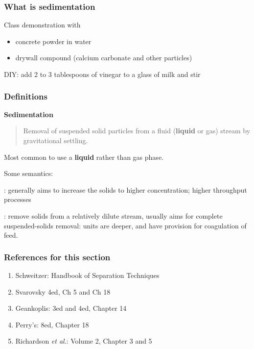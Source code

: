 \begin{comment}

	/Users/kevindunn/Sync/Figures/examples/waste-water-treatment/flickr-4578619015_895f8dabbb_o-CC-BY-NC-SA-2.jpg
	See: http://www.flickr.com/photos/sawater/6434889743/  
	Watch video: http://www.youtube.com/watch?v=gVeW1rr8GEI&feature=related
	Irregular sedmination: http://www.youtube.com/watch?v=u6Y6d7oH6Vs&feature=relmfu

\end{comment}

	
	
\begin{frame}\frametitle{What is sedimentation}
	Class demonstration with
	\begin{itemize}
		\item	concrete powder in water
		\item	drywall compound (calcium carbonate and other particles)
	\end{itemize}

	\vspace{12pt}
	DIY: add 2 to 3 tablespoons of vinegar to a glass of milk and stir	
\end{frame}

\begin{frame}\frametitle{Definitions}	
	\textbf{Sedimentation}
	\begin{quote}	
		Removal of suspended solid particles from a fluid (\textbf{liquid} or gas) stream by gravitational settling.
	\end{quote}
	Most common to use a \textbf{liquid} rather than gas phase.

	\vspace{12pt}
	Some semantics:
	
	\vspace{12pt}	
	{\color{myGreen}{Thickening}}: generally aims to increase the solids to higher concentration; higher throughput processes

	\vspace{12pt}
	{\color{myGreen}{Clarification}}: remove solids from a relatively dilute stream, usually aims for complete suspended-solids removal: units are deeper, and have provision for coagulation of feed.
	
\end{frame}

\begin{frame}\frametitle{References for this section}
	\begin{enumerate}
		\item	Schweitzer: Handbook of Separation Techniques
		\item	Svarovsky 4ed, Ch 5 and Ch 18
		\item	Geankoplis: 3ed and 4ed, Chapter 14
		\item	Perry's: 8ed, Chapter 18
		\item	Richardson \emph{et al}.: Volume 2, Chapter 3 and 5		
	\end{enumerate}
\end{frame}

